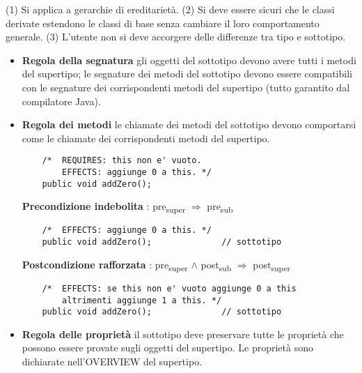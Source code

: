 \documentclass[a4paper, 12pt]{article}
\begin{document}
(1) Si applica a gerarchie di ereditarietà. (2) Si deve essere sicuri che le classi
derivate estendono le classi di base senza cambiare il loro comportamento generale. (3)
L'utente non si deve accorgere delle differenze tra tipo e sottotipo.
\begin{itemize}
    \item \textbf{Regola della segnatura} gli oggetti del sottotipo devono avere tutti
    i metodi del supertipo; le segnature dei metodi del sottotipo devono essere compatibili
    con le segnature dei corrispondenti metodi del supertipo (tutto garantito dal
    compilatore Java). 
    \item \textbf{Regola dei metodi} le chiamate dei metodi del sottotipo devono
    comportarsi come le chiamate dei corrispondenti metodi del supertipo.
    \begin{lstlisting}
    /*  REQUIRES: this non e' vuoto.
        EFFECTS: aggiunge 0 a this. */
    public void addZero();
    \end{lstlisting}
    \textbf{Precondizione indebolita} : pre\textsubscript{super} $\Rightarrow$
    pre\textsubscript{sub}
    \begin{lstlisting}
    /*  EFFECTS: aggiunge 0 a this. */
    public void addZero();              // sottotipo
    \end{lstlisting}
    \textbf{Postcondizione rafforzata} : pre\textsubscript{super} $\wedge$
    post\textsubscript{sub} $\Rightarrow$ post\textsubscript{super}
    \begin{lstlisting}
    /*  EFFECTS: se this non e' vuoto aggiunge 0 a this
        altrimenti aggiunge 1 a this. */
    public void addZero();              // sottotipo
    \end{lstlisting}
    \item \textbf{Regola delle proprietà} il sottotipo deve preservare tutte le proprietà
    che possono essere provate sugli oggetti del supertipo. Le proprietà sono dichiarate
    nell'OVERVIEW del supertipo.
\end{itemize}
\end{document}
